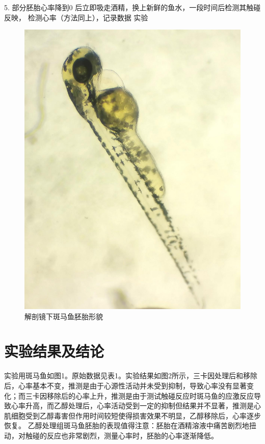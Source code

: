 \documentclass[UTF-8,10.5pt]{ctexart}
\begin{document}
5. 部分胚胎心率降到0 后立即吸走酒精，换上新鲜的鱼水，一段时间后检测其触碰反映，
检测心率（方法同上），记录数据
实验
\begin{figure}[htbp]
    \centering
    \includegraphics[scale = 0.8]{src/zoology/R2DJK5Z.jpg}
    \caption{解剖镜下斑马鱼胚胎形貌}
\end{figure}
    \section{实验结果及结论}
    实验用斑马鱼如图1。原始数据见表1。实验结果如图2所示，三卡因处理后和移除后，心率基本不变，推测是由于心源性活动并未受到抑制，导致心率没有显著变化；而三卡因移除后的心率上升，推测是由于测试触碰反应时斑马鱼的应激反应导致心率升高，而乙醇处理后，心率活动受到一定的抑制但结果并不显著，推测是心肌细胞受到乙醇毒害但作用时间较短使得损害效果不明显，乙醇移除后，心率逐步恢复。
    乙醇处理组斑马鱼胚胎的表现值得注意：胚胎在酒精溶液中痛苦剧烈地扭动，对触碰的反应也非常剧烈，测量心率时，胚胎的心率逐渐降低。
\end{document}
